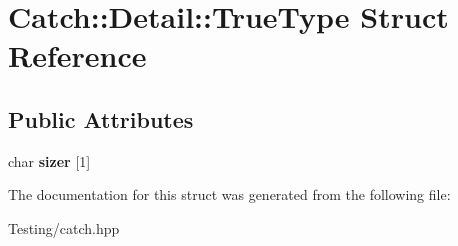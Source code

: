 \hypertarget{struct_catch_1_1_detail_1_1_true_type}{\section{Catch\-:\-:Detail\-:\-:True\-Type Struct Reference}
\label{struct_catch_1_1_detail_1_1_true_type}
}
\subsection*{Public Attributes}
\begin{DoxyCompactItemize}
\item 
\hypertarget{struct_catch_1_1_detail_1_1_true_type_a3aaaeb75909e668b293c8a81f5fb6419}{char {\bfseries sizer} \mbox{[}1\mbox{]}}\label{struct_catch_1_1_detail_1_1_true_type_a3aaaeb75909e668b293c8a81f5fb6419}

\end{DoxyCompactItemize}


The documentation for this struct was generated from the following file\-:\begin{DoxyCompactItemize}
\item 
Testing/catch.\-hpp\end{DoxyCompactItemize}
